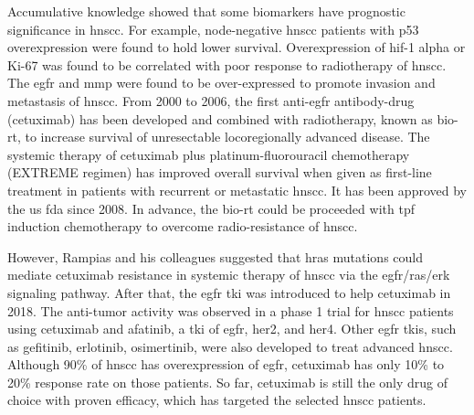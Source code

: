 \documentclass[jpm,article,submit,moreauthors,pdftex]{Definitions/mdpi}
\begin{document}
Accumulative knowledge showed that some biomarkers have prognostic significance in \acrshort{hnscc}. For example, node-negative \acrshort{hnscc} patients with p53 overexpression were found to hold lower survival\cite{DeVicente2004}.
Overexpression of \acrfull{hif}-1 alpha\cite{Aebersold2001} or Ki-67\cite{Couture2002} was found to be correlated with poor response to radiotherapy of \acrshort{hnscc}. The \acrfull{egfr}\cite{O-Charoenrat2000}\cite{Bentzen2005} and \acrfull{mmp}\cite{Harrington2017} were found to be over-expressed to promote invasion and metastasis of \acrshort{hnscc}.
From 2000 to 2006, the first anti-\acrshort{egfr} antibody-drug (cetuximab) has been developed and combined with radiotherapy, known as bio-\acrshort{rt}, to increase survival of unresectable locoregionally advanced disease\cite{Bonner2006a}.
The systemic therapy of cetuximab plus platinum-fluorouracil chemotherapy (EXTREME regimen) has improved overall survival when given as first-line treatment in patients with recurrent or metastatic \acrshort{hnscc}\cite{Vermorken2008}\cite{Rivera2009}. It has been approved by the \acrshort{us} \acrfull{fda} since 2008. In advance, the bio-\acrshort{rt} could be proceeded with \acrfull{tpf} induction chemotherapy to overcome  radio-resistance of \acrshort{hnscc}\cite{Blanchard2013}.

However, Rampias and his colleagues\cite{Rampias2014} suggested that \acrfull{hras} mutations could mediate cetuximab resistance in systemic therapy of \acrshort{hnscc} via the \acrshort{egfr}/\acrfull{ras}/\acrfull{erk} signaling pathway.
After that, the \acrshort{egfr} \acrfull{tki} was introduced to help cetuximab in 2018. The anti-tumor activity was observed in a phase 1 trial for \acrshort{hnscc} patients using cetuximab and afatinib, a \acrshort{tki} of \acrshort{egfr}, \acrfull{her}2, and \acrshort{her}4\cite{Gazzah2018}. Other \acrshort{egfr} \acrshort{tki}s, such as gefitinib, erlotinib, osimertinib, were also developed to treat advanced \acrshort{hnscc}.
Although 90\% of \acrshort{hnscc} has overexpression of \acrshort{egfr}, cetuximab has only 10\% to 20\% response rate on those patients. So far, cetuximab is still the only drug of choice with proven efficacy, which has targeted the selected \acrshort{hnscc} patients\cite{Taberna2019}.
\end{document}
